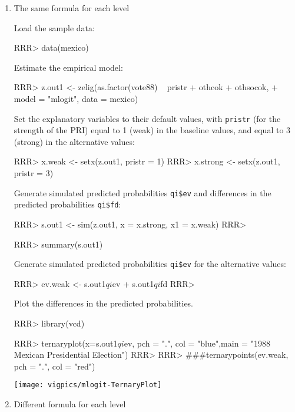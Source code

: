 \begin{enumerate}

\item {The same formula for each level}

Load the sample data:  
\begin{Schunk}
\begin{Sinput}
RRR>  data(mexico)
\end{Sinput}
\end{Schunk}
Estimate the empirical model:  
\begin{Schunk}
\begin{Sinput}
RRR>  z.out1 <- zelig(as.factor(vote88) ~ pristr + othcok + othsocok, 
+                   model = "mlogit", data = mexico)
\end{Sinput}
\end{Schunk}
Set the explanatory variables to their default values, with {\tt pristr}
(for the strength of the PRI) equal to 1 (weak) in the baseline values, and
equal to 3 (strong) in the alternative values:  
\begin{Schunk}
\begin{Sinput}
RRR>  x.weak <- setx(z.out1, pristr = 1)
RRR>  x.strong <- setx(z.out1, pristr = 3)
\end{Sinput}
\end{Schunk}
Generate simulated predicted probabilities {\tt qi\$ev} and differences in
the predicted probabilities {\tt qi\$fd}:
\begin{Schunk}
\begin{Sinput}
RRR>  s.out1 <- sim(z.out1, x = x.strong, x1 = x.weak)
RRR> 
\end{Sinput}
\end{Schunk}
\begin{Schunk}
\begin{Sinput}
RRR> summary(s.out1)
\end{Sinput}
\end{Schunk}
Generate simulated predicted probabilities {\tt qi\$ev} for the
alternative values:  
\begin{Schunk}
\begin{Sinput}
RRR>  ev.weak <- s.out1$qi$ev + s.out1$qi$fd
RRR> 
\end{Sinput}
\end{Schunk}
Plot the differences in the predicted probabilities.  
\begin{Schunk}
\begin{Sinput}
RRR>  library(vcd)
\end{Sinput}
\end{Schunk}
\begin{center}
\begin{Schunk}
\begin{Sinput}
RRR> ternaryplot(x=s.out1$qi$ev, pch = ".", col = "blue",main = "1988 Mexican Presidential Election")
RRR> 
RRR> ###ternarypoints(ev.weak, pch = ".", col = "red")
\end{Sinput}
\end{Schunk}
\texttt{[image: vigpics/mlogit-TernaryPlot]}
\end{center}
\item {Different formula for each level}


\end{enumerate}
